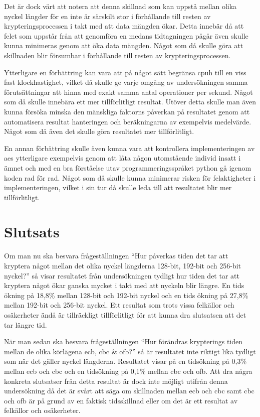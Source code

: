 Det är dock värt att notera att denna skillnad som kan uppstå mellan olika nyckel längder för en inte är särskilt stor i förhållande till resten av krypteringsprocessen
i takt med att data mängden ökar. Detta innebär då att felet som uppstår från att genomföra en medans tidtagningen pågår även skulle kunna minimeras genom att
öka data mängden. Något som då skulle göra att skillnaden blir försumbar i förhållande till resten av krypteringsprocessen.%

Ytterligare en förbättring kan vara att på något sätt begränsa \gls{cpuh} till en viss fast klockhastighet, vilket då skulle ge varje omgång av undersökningen samma förutsättningar
att hinna med exakt samma antal operationer per sekund. Något som då skulle innebära ett mer tillförlitligt resultat. Utöver detta skulle man även kunna försöka minska den mänskliga faktorns
påverkan på resultatet genom att automatisera resultat hanteringen och beräkningarna av exempelvis medelvärde. Något som då även det skulle göra resultatet mer tillförlitligt. %

En annan förbättring skulle även kunna vara att kontrollera implementeringen av \acrshort{aes} ytterligare exempelvis genom att låta någon utomstående individ insatt i ämnet och
med en bra förståelse utav programmeringsspråket \gls{python} gå igenom koden rad för rad. Något som då skulle kunna minimerar risken för felaktigheter i implementeringen,
vilket i sin tur då skulle leda till att resultatet blir mer tillförlitligt. %

\section{Slutsats} %
\label{sec:conclusion}
Om man nu ska besvara frågeställningen “Hur påverkas tiden det tar att kryptera något mellan det olika nyckel längderna 128-bit, 192-bit och 256-bit nyckel?” så visar resultatet från
undersökningen tydligt hur tiden det tar att kryptera något ökar ganska mycket i takt med att nyckeln blir längre. En tids ökning på 18,8\% mellan 128-bit och 192-bit nyckel och en tids ökning på 27,8\%
mellan 192-bit och 256-bit nyckel. Ett resultat som trots vissa felkällor och osäkerheter ändå är tillräckligt tillförlitligt för att kunna dra slutsatsen att det tar längre tid.

När man sedan ska besvara frågeställningen “Hur förändras krypterings tiden mellan de olika körlägena \acrshort{ecb}, \acrshort{cbc} \& \acrshort{ofb}?” så är resultatet inte
riktigt lika tydligt som när det gäller nyckel längderna. Resultatet visar på en tidsökning på 0,3\% mellan \acrshort{ecb} och \acrshort{cbc} och en tidsökning på 0,1\% mellan \acrshort{cbc} och
\acrshort{ofb}. Att dra några konkreta slutsatser från detta resultat är dock inte möjligt utifrån denna undersökning då det är svårt att säga om skillnaden mellan \acrshort{ecb} och \acrshort{cbc} samt
\acrshort{cbc} och \acrshort{ofb} är på grund av en faktisk tidsskillnad eller om det är ett resultat av felkällor och osäkerheter.

